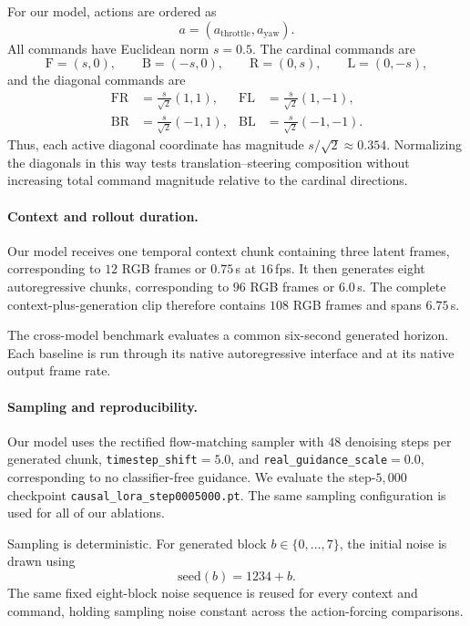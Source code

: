 \documentclass[letterpaper]{article} %
\begin{document}
For our model, actions are ordered as
\[
a=(a_{\mathrm{throttle}},a_{\mathrm{yaw}}).
\]
All commands have Euclidean norm $s=0.5$. The cardinal commands are
\[
\mathrm{F}=(s,0),\qquad
\mathrm{B}=(-s,0),\qquad
\mathrm{R}=(0,s),\qquad
\mathrm{L}=(0,-s),
\]
and the diagonal commands are
\[
\begin{aligned}
\mathrm{FR}&=\frac{s}{\sqrt{2}}(1,1),&
\mathrm{FL}&=\frac{s}{\sqrt{2}}(1,-1),\\
\mathrm{BR}&=\frac{s}{\sqrt{2}}(-1,1),&
\mathrm{BL}&=\frac{s}{\sqrt{2}}(-1,-1).
\end{aligned}
\]
Thus, each active diagonal coordinate has magnitude
$s/\sqrt{2}\approx0.354$. Normalizing the diagonals in this way tests
translation--steering composition without increasing total command magnitude
relative to the cardinal directions.

\paragraph{Context and rollout duration.}
Our model receives one temporal context chunk containing three latent frames,
corresponding to $12$ RGB frames or $0.75$\,s at $16$\,fps. It then generates
eight autoregressive chunks, corresponding to $96$ RGB frames or $6.0$\,s.
The complete context-plus-generation clip therefore contains $108$ RGB frames
and spans $6.75$\,s.

The cross-model benchmark evaluates a common six-second generated horizon.
Each baseline is run through its native autoregressive interface and at its
native output frame rate.

\paragraph{Sampling and reproducibility.}
Our model uses the rectified flow-matching sampler with $48$ denoising steps
per generated chunk, \texttt{timestep\_shift}$=5.0$, and
\texttt{real\_guidance\_scale}$=0.0$, corresponding to no classifier-free
guidance. We evaluate the step-$5{,}000$ checkpoint
\texttt{causal\_lora\_step0005000.pt}. The same sampling configuration is used
for all of our ablations.

Sampling is deterministic. For generated block
$b\in\{0,\ldots,7\}$, the initial noise is drawn using
\[
\mathrm{seed}(b)=1234+b.
\]
The same fixed eight-block noise sequence is reused for every context and
command, holding sampling noise constant across the action-forcing
comparisons.
\end{document}
